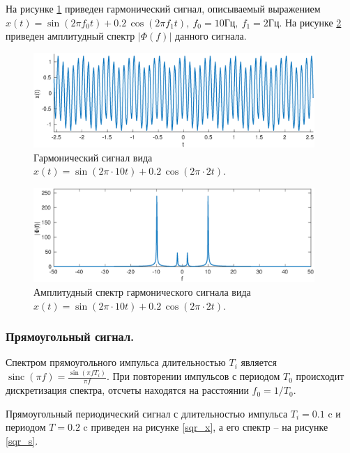 \documentclass[a4paper,14pt]{extarticle}
\DeclareMathOperator{\sinc}{sinc}
\begin{document}
На рисунке \ref{sin_x} приведен гармонический сигнал, описываемый выражением $x(t) = \sin(2 \pi f_0 t) + 0.2 \, \cos(2 \pi f_1 t), ~ f_0 = 10\text{Гц}, ~ f_1 = 2\text{Гц}$. На рисунке \ref{sin_s} приведен амплитудный спектр $|\Phi(f)|$ данного сигнала.	

\begin{figure}[H]
\includegraphics[width=0.95\textwidth]{sin_x.eps}
\captionsetup{justification=centering,margin=2cm}
\caption{Гармонический сигнал вида $x(t) = \sin(2 \pi \cdot 10 t) + 0.2 \, \cos(2 \pi \cdot 2 t)$.}
\label{sin_x}
\end{figure}

\begin{figure}[H]
\includegraphics[width=0.95\textwidth]{sin_s.eps}
\captionsetup{justification=centering,margin=1cm}
\caption{Амплитудный спектр гармонического сигнала вида $x(t) = \sin(2 \pi \cdot 10 t) + 0.2 \, \cos(2 \pi \cdot 2 t)$.}
\label{sin_s}
\end{figure}


\subsubsection{Прямоугольный сигнал.}
Спектром прямоугольного импульса длительностью $T_i$ является $\sinc(\pi f)=\frac{\sin(\pi f T_i)}{\pi f}$. При повторении импульсов с периодом $T_0$ происходит дискретизация спектра, отсчеты находятся на расстоянии $f_0 = 1/T_0$. 

Прямоугольный периодический сигнал с длительностью импульса $T_i = 0.1$ c и периодом $T = 0.2$ c приведен на рисунке \ref{sqr_x}, а его спектр -- на рисунке \ref{sqr_s}. 
\end{document}
